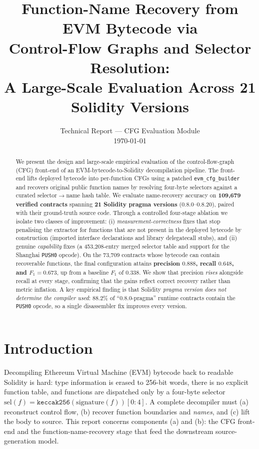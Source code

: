 \documentclass[10pt,conference]{article}
\title{\textbf{Function-Name Recovery from EVM Bytecode via\\
Control-Flow Graphs and Selector Resolution:\\
A Large-Scale Evaluation Across 21 Solidity Versions}}
\author{%
  Technical Report --- CFG Evaluation Module\\
  \today
}
\date{}
\begin{document}
\maketitle

\begin{abstract}
We present the design and large-scale empirical evaluation of the
control-flow-graph (CFG) front-end of an EVM-bytecode-to-Solidity decompilation
pipeline. The front-end lifts deployed bytecode into per-function CFGs using a
patched \texttt{evm\_cfg\_builder} and recovers original public function names by
resolving four-byte selectors against a curated selector$\rightarrow$name hash
table. We evaluate name-recovery accuracy on \textbf{109{,}679 verified
contracts} spanning \textbf{21 Solidity pragma versions} (0.8.0--0.8.20), paired
with their ground-truth source code. Through a controlled four-stage ablation we
isolate two classes of improvement: (i) \emph{measurement-correctness} fixes
that stop penalising the extractor for functions that are not present in the
deployed bytecode by construction (imported interface declarations and library
delegatecall stubs), and (ii) genuine \emph{capability} fixes (a 453{,}208-entry
merged selector table and support for the Shanghai \texttt{PUSH0} opcode). On the
73{,}709 contracts whose bytecode can contain recoverable functions, the final
configuration attains \textbf{precision $0.888$, recall $0.648$, and
$F_1=0.673$}, up from a baseline $F_1$ of $0.338$. We show that precision
\emph{rises} alongside recall at every stage, confirming that the gains reflect
correct recovery rather than metric inflation. A key empirical finding is that
Solidity \emph{pragma version does not determine the compiler used}: $88.2\%$ of
``0.8.0-pragma'' runtime contracts contain the \texttt{PUSH0} opcode, so a single
disassembler fix improves every version.
\end{abstract}

\section{Introduction}

Decompiling Ethereum Virtual Machine (EVM) bytecode back to readable Solidity is
hard: type information is erased to 256-bit words, there is no explicit function
table, and functions are dispatched only by a four-byte selector
$\mathrm{sel}(f)=\mathtt{keccak256}(\text{signature}(f))[0{:}4]$. A complete
decompiler must (a) reconstruct control flow, (b) recover function boundaries and
\emph{names}, and (c) lift the body to source. This report concerns components
(a) and (b): the CFG front-end and the function-name-recovery stage that feed the
downstream source-generation model.
\end{document}
